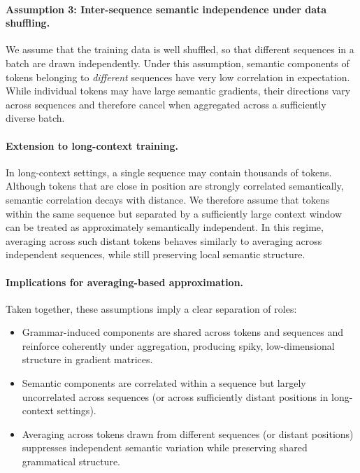 \paragraph{Assumption 3: Inter-sequence semantic independence under data shuffling.}
We assume that the training data is well shuffled, so that different sequences in a
batch are drawn independently.
Under this assumption, semantic components of tokens belonging to \emph{different}
sequences have very low correlation in expectation.
While individual tokens may have large semantic gradients, their directions vary
across sequences and therefore cancel when aggregated across a sufficiently diverse
batch.

\paragraph{Extension to long-context training.}
In long-context settings, a single sequence may contain thousands of tokens.
Although tokens that are close in position are strongly correlated semantically,
semantic correlation decays with distance.
We therefore assume that tokens within the same sequence but separated by a
sufficiently large context window can be treated as approximately semantically
independent.
In this regime, averaging across such distant tokens behaves similarly to averaging
across independent sequences, while still preserving local semantic structure.

\paragraph{Implications for averaging-based approximation.}
Taken together, these assumptions imply a clear separation of roles:
\begin{itemize}
    \item Grammar-induced components are shared across tokens and sequences and
    reinforce coherently under aggregation, producing spiky, low-dimensional
    structure in gradient matrices.
    \item Semantic components are correlated within a sequence but largely
    uncorrelated across sequences (or across sufficiently distant positions in
    long-context settings).
    \item Averaging across tokens drawn from different sequences (or distant
    positions) suppresses independent semantic variation while preserving shared
    grammatical structure.
\end{itemize}

